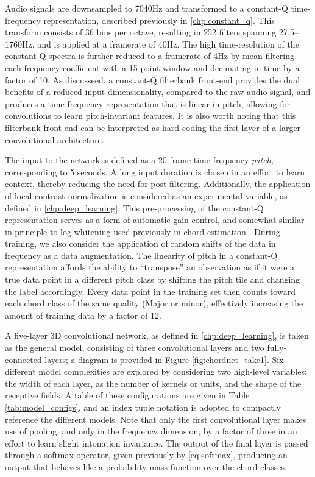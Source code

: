 Audio signals are downsampled to 7040Hz and transformed to a constant-Q time-frequency representation, described previously in \ref{chp:constant_q}.
This transform consists of 36 bins per octave, resulting in 252 filters spanning 27.5--1760Hz, and is applied at a framerate of 40Hz.
The high time-resolution of the constant-Q spectra is further reduced to a framerate of 4Hz by mean-filtering each frequency coefficient with a 15-point window and decimating in time by a factor of 10.
As discusseed, a constant-Q filterbank front-end provides the dual benefits of a reduced input dimensionality, compared to the raw audio signal, and produces a time-frequency representation that is linear in pitch, allowing for convolutions to learn pitch-invariant features.
It is also worth noting that this filterbank front-end can be interpreted as hard-coding the first layer of a larger convolutional architecture.

The input to the network is defined as a 20-frame time-frequency \emph{patch}, corresponding to 5 seconds.
A long input duration is chosen in an effort to learn context, thereby reducing the need for post-filtering.
Additionally, the application of local-contrast normalization is considered as an experimental variable, as defined in \ref{chp:deep_learning}.
This pre-processing of the constant-Q representation serves as a form of automatic gain control, and somewhat similar in principle to log-whitening used previously in chord estimation \cite{Cho2011}.
During training, we also consider the application of random shifts of the data in frequency as a data augmentation.
The linearity of pitch in a constant-Q representation affords the ability to ``transpose'' an observation as if it were a true data point in a different pitch class by shifting the pitch tile and changing the label accordingly.
Every data point in the training set then counts toward each chord class of the same quality (Major or minor), effectively increasing the amount of training data by a factor of 12.

A five-layer 3D convolutional network, as defined in \ref{chp:deep_learning}, is taken as the general model, consisting of three convolutional layers and two fully-connected layers; a diagram is provided in Figure \ref{fig:chordnet_take1}.
Six different model complexities are explored by considering two high-level variables: the width of each layer, as the number of kernels or units, and the shape of the receptive fields.
A table of these configurations are given in Table \ref{tab:model_configs}, and an index tuple notation is adopted to compactly reference the different models.
Note that only the first convolutional layer makes use of pooling, and only in the frequency dimension, by a factor of three in an effort to learn slight intonation invariance.
The output of the final layer is passed through a softmax operator, given previously by \ref{eq:softmax}, producing an output that behaves like a probability mass function over the chord classes.


